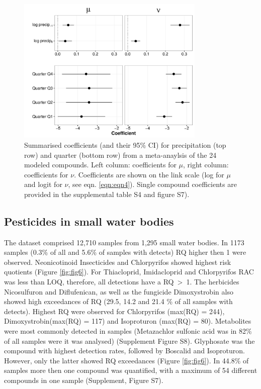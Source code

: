 \documentclass[journal=esthag,manuscript=article]{achemso}
\begin{document}
\begin{figure}[ht]
  \includegraphics[width=0.8\textwidth]{figure5.pdf}
  \caption{Summarised coefficients (and their 95\% CI) for precipitation (top row) and quarter (bottom row) from a meta-anaylsis of the 24 modeled compounds. Left column: coefficients for $\mu$, right column: coefficients for $\nu$. 
  Coefficients are shown on the link scale (log for $\mu$ and logit for $\nu$, see eqn. \ref{eqn:eqn4}).
  Single compound coefficients are provided in the supplemental table S4 and figure S7).
  }
  \label{fig:fig5}
\end{figure}



\subsection{Pesticides in small water bodies}
The dataset comprised 12,710 samples from 1,295 small water bodies.
In 1173 samples (0.3\% of all and 5.6\% of samples with detects) RQ higher then 1 were observed.
Neonicotinoid Insecticides and Chlorpyrifos showed highest risk quotients (Figure \ref{fig:fig6}).
For Thiacloprid, Imidacloprid and Chlorpyrifos RAC was less than LOQ, therefore, all detections have a RQ~\textgreater~1. 
The herbicides Nicosulfuron and Diflufenican, as well as the fungicide Dimoxystrobin also showed high exceedances of RQ (29.5, 14.2 and 21.4 \% of all samples with detects).
Highest RQ were observed for Chlorpyrifos (max(RQ) = 244), Dimoxystrobin(max(RQ) = 117) and Isoproturon (max(RQ) = 80). 
Metabolites were most commonly detected in samples (Metazachlor sulfonic acid was in 82\% of all samples were it was analysed) (Supplement Figure S8).
Glyphosate was the compound with highest detection rates, followed by Boscalid and Isoproturon. 
However, only the latter showed RQ exceedances (Figure \ref{fig:fig6}).
In 44.8\% of samples more then one compound was quantified, with a maximum of 54 different compounds in one sample (Supplement, Figure S7). 
\end{document}
